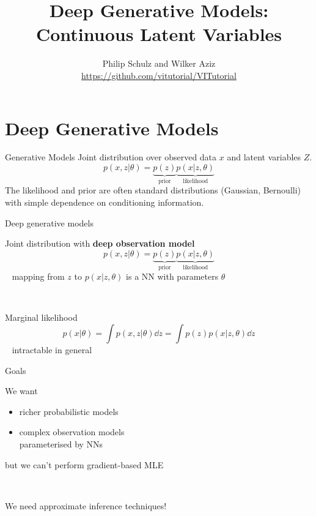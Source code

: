 \documentclass[14pt]{beamer}
\title{Deep Generative Models: \\
Continuous Latent Variables}
\author{Philip Schulz and Wilker Aziz\\
\url{https://github.com/vitutorial/VITutorial}}
\date{}
\begin{document}
\begin{frame}
\maketitle
\end{frame}

\frame{\tableofcontents}

\section{Deep Generative Models}
\frame{\tableofcontents[currentsection]}

\begin{frame}{Generative Models}
Joint distribution over observed data $ x $ and latent variables $ Z $.
\begin{equation*}
p(x,z|\theta) =  \underbrace{p(z)}_{\text{prior}} \underbrace{p(x|z,\theta)}_{\text{likelihood}}
\end{equation*} 
The likelihood and prior are often standard distributions (Gaussian, Bernoulli) with simple dependence on conditioning
information.
\end{frame}

\begin{frame}{Deep generative models}

Joint distribution with {\bf deep observation model}
\begin{equation*}
p(x, z|\theta) = \underbrace{p(z)}_{\text{prior}} \underbrace{p(x|z, \theta)}_{\text{likelihood}}
\end{equation*}
~ {\small mapping from $z$ to $p(x|z, \theta)$ is a NN with parameters $\theta$}

~ \pause

Marginal likelihood 
\begin{equation*}
p(x|\theta) = \int p(x, z|\theta) \dd{z} = \int p(z)p(x|z, \theta) \dd{z} 
\end{equation*}
~ \alert{intractable} in general



\end{frame}


\begin{frame}{Goals}


We want
\begin{itemize}
	\item richer probabilistic models  \pause
	\item complex observation models \\
	parameterised by NNs 
\end{itemize}
\pause
but we can't perform gradient-based MLE

~

\pause

We need \alert{approximate inference} techniques!

\end{frame}
\end{document}
